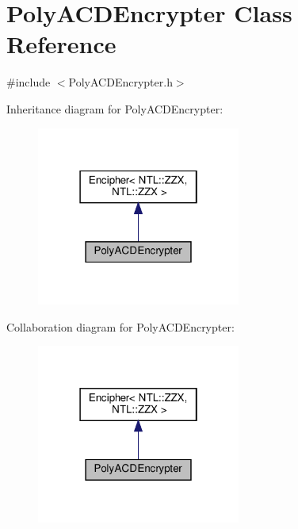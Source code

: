 \hypertarget{classPolyACDEncrypter}{}\section{Poly\+A\+C\+D\+Encrypter Class Reference}
\label{classPolyACDEncrypter}


{\ttfamily \#include $<$Poly\+A\+C\+D\+Encrypter.\+h$>$}



Inheritance diagram for Poly\+A\+C\+D\+Encrypter\+:
\nopagebreak
\begin{figure}[H]
\begin{center}
\leavevmode
\includegraphics[width=190pt]{classPolyACDEncrypter__inherit__graph}
\end{center}
\end{figure}


Collaboration diagram for Poly\+A\+C\+D\+Encrypter\+:
\nopagebreak
\begin{figure}[H]
\begin{center}
\leavevmode
\includegraphics[width=190pt]{classPolyACDEncrypter__coll__graph}
\end{center}
\end{figure}
